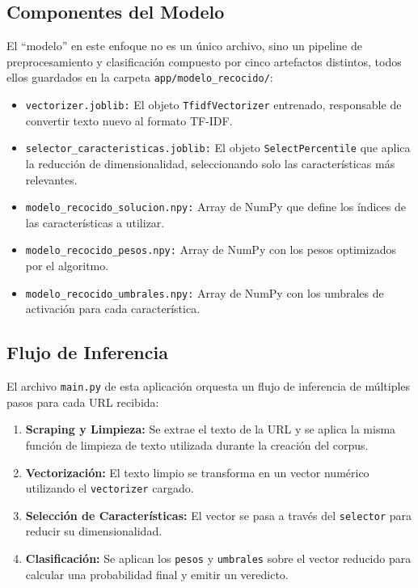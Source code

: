 \subsection{Componentes del Modelo}
El ``modelo'' en este enfoque no es un único archivo, sino un pipeline de preprocesamiento y clasificación compuesto por cinco artefactos distintos, todos ellos guardados en la carpeta \texttt{app/modelo\_recocido/}:
\begin{itemize}
    \item \texttt{vectorizer.joblib:} El objeto \texttt{TfidfVectorizer} entrenado, responsable de convertir texto nuevo al formato TF-IDF.
    \item \texttt{selector\_caracteristicas.joblib:} El objeto \texttt{SelectPercentile} que aplica la reducción de dimensionalidad, seleccionando solo las características más relevantes.
    \item \texttt{modelo\_recocido\_solucion.npy:} Array de NumPy que define los índices de las características a utilizar.
    \item \texttt{modelo\_recocido\_pesos.npy:} Array de NumPy con los pesos optimizados por el algoritmo.
    \item \texttt{modelo\_recocido\_umbrales.npy:} Array de NumPy con los umbrales de activación para cada característica.
\end{itemize}

\subsection{Flujo de Inferencia}
El archivo \texttt{main.py} de esta aplicación orquesta un flujo de inferencia de múltiples pasos para cada URL recibida:
\begin{enumerate}
    \item \textbf{Scraping y Limpieza:} Se extrae el texto de la URL y se aplica la misma función de limpieza de texto utilizada durante la creación del corpus.
    \item \textbf{Vectorización:} El texto limpio se transforma en un vector numérico utilizando el \texttt{vectorizer} cargado.
    \item \textbf{Selección de Características:} El vector se pasa a través del \texttt{selector} para reducir su dimensionalidad.
    \item \textbf{Clasificación:} Se aplican los \texttt{pesos} y \texttt{umbrales} sobre el vector reducido para calcular una probabilidad final y emitir un veredicto.
\end{enumerate}

